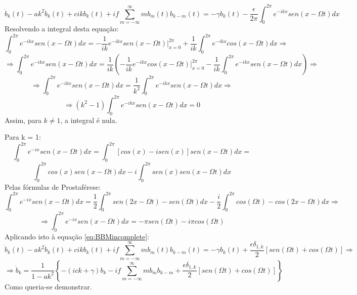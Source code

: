 \documentclass{article}[twocolumn]
\begin{document}
	\begin{equation}
		\dot{b}_k(t) - ak^2\dot{b}_k(t) + cikb_k(t) + if\sum_{m = -\infty}^{\infty} mb_m(t)b_{k - m}(t)
		= -\gamma b_k(t) - \frac{\epsilon}{2\pi}\int_0^{2\pi}e^{-ikx}sen(x - \Omega t)dx
		\label{eq:BBMincomplete}
	\end{equation}
	Resolvendo a integral desta equa\c{c}\~ao:
	\begin{equation}
		\int_0^{2\pi}e^{-ikx}sen(x - \Omega t)dx = -\frac{1}{ik}e^{-ikx}sen(x - \Omega t)\big|_{x = 0}^{2\pi}
		+ \frac{1}{ik}\int_0^{2\pi}e^{-ikx}cos(x - \Omega t)dx \Rightarrow
		\nonumber
	\end{equation}
	\begin{equation}
		\Rightarrow \int_0^{2\pi}e^{-ikx}sen(x - \Omega t)dx = \frac{1}{ik}\left(-\frac{1}{ik}e^{-ikx}cos(x - \Omega t)\big|_{x = 0}^{2\pi}
		- \frac{1}{ik}\int_0^{2\pi}e^{-ikx}sen(x - \Omega t)dx\right) \Rightarrow
		\nonumber
	\end{equation}
	\begin{equation}
		\Rightarrow \int_0^{2\pi}e^{-ikx}sen(x - \Omega t)dx = \frac{1}{k^2}\int_0^{2\pi}e^{-ikx}sen(x - \Omega t)dx \Rightarrow
		\nonumber
	\end{equation}
	\begin{equation}
		\Rightarrow (k^2 - 1)\int_0^{2\pi}e^{-ikx}sen(x - \Omega t)dx = 0
		\nonumber
	\end{equation}
	Assim, para $k \neq 1$, a integral \'e nula.
	
	Para k = 1:
	\begin{equation}
		\int_0^{2\pi}e^{-ix}sen(x - \Omega t)dx = \int_0^{2\pi}[cos(x) - isen(x)]sen(x - \Omega t)dx =
		\nonumber
	\end{equation}
	\begin{equation}
		\int_0^{2\pi}cos(x)sen(x - \Omega t)dx - i\int_0^{2\pi}sen(x)sen(x - \Omega t)dx
		\nonumber
	\end{equation}
	Pelas f\'ormulas de Prostaf\'erese:
	\begin{equation}
		\int_0^{2\pi}e^{-ix}sen(x - \Omega t)dx = \frac{1}{2}\int_0^{2\pi}sen(2x - \Omega t) - sen(\Omega t)dx -
		\frac{i}{2}\int_0^{2\pi}cos(\Omega t) - cos(2x - \Omega t)dx \Rightarrow
		\nonumber
	\end{equation}
	\begin{equation}
		\Rightarrow \int_0^{2\pi}e^{-ix}sen(x - \Omega t)dx = -\pi sen(\Omega t) - i\pi cos(\Omega t)
		\nonumber
	\end{equation}
	Aplicando isto \`a equa\c{c}\~ao \ref{eq:BBMincomplete}:
	\begin{equation}
		\dot{b}_k(t) - ak^2\dot{b}_k(t) + cikb_k(t) + if\sum_{m = -\infty}^{\infty} mb_m(t)b_{k - m}(t)
		= -\gamma b_k(t) + \frac{\epsilon \delta_{1, k}}{2}\left[sen(\Omega t) + cos(\Omega t)\right] \Rightarrow
		\nonumber
	\end{equation}
	\begin{equation}
		\Rightarrow \dot{b}_k = \frac{1}{1 - ak^2}\left\{-(ick + \gamma)b_k - if\sum_{m = -\infty}^{\infty} mb_mb_{k - m}
		+ \frac{\epsilon \delta_{1, k}}{2}\left[sen(\Omega t) + cos(\Omega t)\right]\right\}
		\nonumber
	\end{equation}
	Como queria-se demonstrar.
\end{document}
